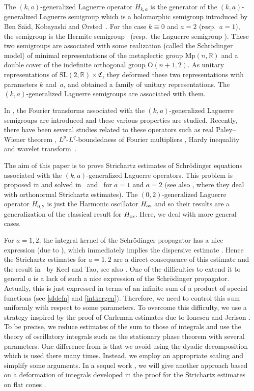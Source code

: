 \documentclass[10pt,a4paper]{amsart}
\numberwithin{equation}{section}
\def\R{\mathbb{R}}%
\def\SL{\mathrm{SL}}
\begin{document}
The $(k,a)$-generalized Laguerre operator $H_{k,a}$ is the generator of the $(k,a)$-generalized Laguerre semigroup which is a holomorphic semigroup introduced by Ben Sa\"{\i}d, Kobayashi and {\O}rsted~\cite{BKO}.
For the case $k\equiv 0$ and $a=2$ (resp.\ $a=1$), the semigroup is the Hermite semigroup~\cite{Fol, H} (resp.\ the Laguerre semigroup \cite{KM1, KM, KM2}).
These two semigroups are associated with some realization (called the Schr\"odinger model) of minimal representations of the metaplectic group $\mathrm{Mp}(n,\R)$ and a double cover of the indefinite orthogonal group $\mathrm{O}(n+1,2)$.
As unitary representations of $\widetilde{\SL}(2,\R)\times\mathfrak{C}$, they deformed these two representations with parameters $k$ and~$a$, and obtained a family of unitary representations.
The $(k,a)$-generalized Laguerre semigroups are associated with them.

In \cite{BKO}, the Fourier transforms associated with the $(k,a)$-generalized Laguerre semigroups are introduced and these various properties are studied. Recently, there have been several studies related to these operators such as real Paley--Wiener theorem \cite{LLF}, $L^p$-$L^q$-boundedness of Fourier multipliers \cite{KR}, Hardy inequality \cite{Te} and wavelet transform~\cite{BMMS}.

The aim of this paper is to prove Strichartz estimates of Schr\"odinger equations associated with the $(k,a)$-generalized Laguerre operators. This problem is proposed in \cite{BKO} and solved in~\cite{B} and~\cite{M} for $a=1$ and $a=2$ (see also \cite{MS}, where they deal with orthonormal Strichartz estimates). The $(0,2)$-generalized Laguerre operator $H_{0,2}$ is just the Harmonic oscillator $H_{\rm os}$ and so their results are a generalization of the classical result for $H_{\rm os}$. Here, we deal with more general cases.

For $a=1,2$, the integral kernel of the Schr\"odinger propagator has a nice expression (due to \cite[formula~(4.58)]{BKO}), which immediately implies the dispersive estimate \cite[Proposition 4.26]{BKO}. Hence the Strichartz estimates for $a=1,2$ are a direct consequence of this estimate and the result in~\cite{KT} by Keel and Tao, see also \cite{B,MS}. One of the difficulties to extend it to general $a$ is a lack of such a nice expression of the Schr\"odinger propagator. Actually, this is just expressed in terms of an infinite sum of a product of special functions (see \eqref{sIdefn} and \eqref{intkergen}). Therefore, we need to control this sum uniformly with respect to some parameters.
To overcome this difficulty, we use a strategy inspired by the proof of Carleman estimates due to Ionescu and Jerison \cite{IJ}. To be precise, we reduce estimates of the sum to those of integrals and use the theory of oscillatory integrals such as the stationary phase theorem with several parameters. One difference from \cite{IJ} is that we avoid using the dyadic decomposition which is used there many times. Instead, we employ an appropriate scaling and simplify some arguments.
In a sequel work \cite{TT}, we will give another approach based on a deformation of integrals developed in the proof for the Strichartz estimates on flat cones \cite{F}.
\end{document}
